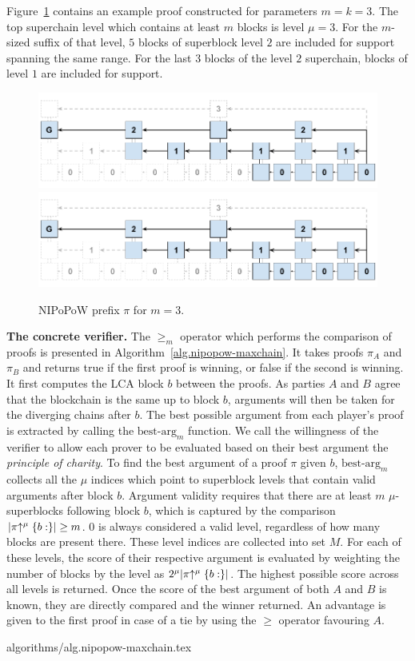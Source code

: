 Figure~\ref{fig.nipopow} contains an example proof constructed for parameters
$m = k = 3$. The top superchain level which contains at least $m$ blocks is
level $\mu = 3$. For the $m$-sized suffix of that level, $5$ blocks of
superblock level $2$ are included for support spanning the same range. For the
last $3$ blocks of the level $2$ superchain, blocks of level $1$ are included
for support.

\begin{figure}[h]
    \caption{
    NIPoPoW prefix $\pi$ for $m = 3$.
    }
    \centering
    \iftwocolumn
        \includegraphics[width=0.9\columnwidth,keepaspectratio]{figures/non-interactive-popow.png}
    \else
        \includegraphics[width=0.7\columnwidth,keepaspectratio]{figures/non-interactive-popow.png}
    \fi
    \label{fig.nipopow}
\end{figure}

\noindent
\textbf{The concrete verifier.}
The $\geq_m$ operator which performs the comparison of proofs is presented in
Algorithm~\ref{alg.nipopow-maxchain}. It takes proofs $\pi_A$ and $\pi_B$ and
returns true if the first proof is winning, or false if the second is winning.
It first computes the LCA block $b$ between the proofs. As parties $A$ and $B$
agree that the blockchain is the same up to block $b$, arguments will then be
taken for the diverging chains after $b$. The best possible argument from each
player's proof is extracted by calling the $\text{best-arg}_m$ function. We call
the willingness of the verifier to allow each prover to be evaluated based on
their best argument the \textit{principle of charity}. To find the best argument
of a proof $\pi$ given $b$, $\text{best-arg}_m$ collects all the $\mu$ indices
which point to superblock levels that contain valid arguments after block $b$.
Argument validity requires that there are at least $m$ $\mu$-superblocks
following block $b$, which is captured by the comparison
$|\pi\negthickspace\uparrow^\mu\{b:\}| \geq m$. $0$ is always considered a valid level,
regardless of how many blocks are present there. These level indices are
collected into set $M$. For each of these levels, the score of their respective
argument is evaluated by weighting the number of blocks by the level as
$2^\mu|\pi\negthickspace\uparrow^\mu\{b:\}|$. The highest possible score across all levels is
returned. Once the score of the best argument of both $A$ and $B$ is known, they
are directly compared and the winner returned.  An advantage is given to the
first proof in case of a tie by using the $\geq$ operator favouring $A$.

{algorithms/alg.nipopow-maxchain.tex}
